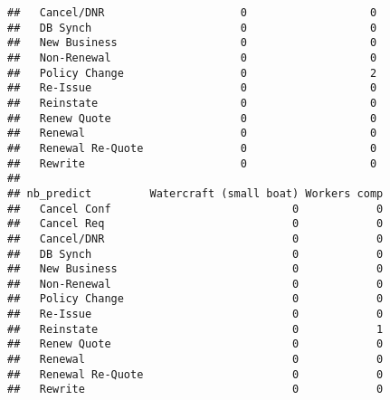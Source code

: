 \documentclass[]{article}
\newenvironment{Shaded}{\begin{snugshade}}{\end{snugshade}}
\newcommand{\KeywordTok}[1]{\textcolor[rgb]{0.13,0.29,0.53}{\textbf{#1}}}
\newcommand{\NormalTok}[1]{#1}
\newcommand{\OperatorTok}[1]{\textcolor[rgb]{0.81,0.36,0.00}{\textbf{#1}}}
\begin{document}
\begin{verbatim}
##   Cancel/DNR                     0                   0
##   DB Synch                       0                   0
##   New Business                   0                   0
##   Non-Renewal                    0                   0
##   Policy Change                  0                   2
##   Re-Issue                       0                   0
##   Reinstate                      0                   0
##   Renew Quote                    0                   0
##   Renewal                        0                   0
##   Renewal Re-Quote               0                   0
##   Rewrite                        0                   0
##                   
## nb_predict         Watercraft (small boat) Workers comp
##   Cancel Conf                            0            0
##   Cancel Req                             0            0
##   Cancel/DNR                             0            0
##   DB Synch                               0            0
##   New Business                           0            0
##   Non-Renewal                            0            0
##   Policy Change                          0            0
##   Re-Issue                               0            0
##   Reinstate                              0            1
##   Renew Quote                            0            0
##   Renewal                                0            0
##   Renewal Re-Quote                       0            0
##   Rewrite                                0            0
\end{verbatim}

\begin{Shaded}
\end{Shaded}
\end{document}
